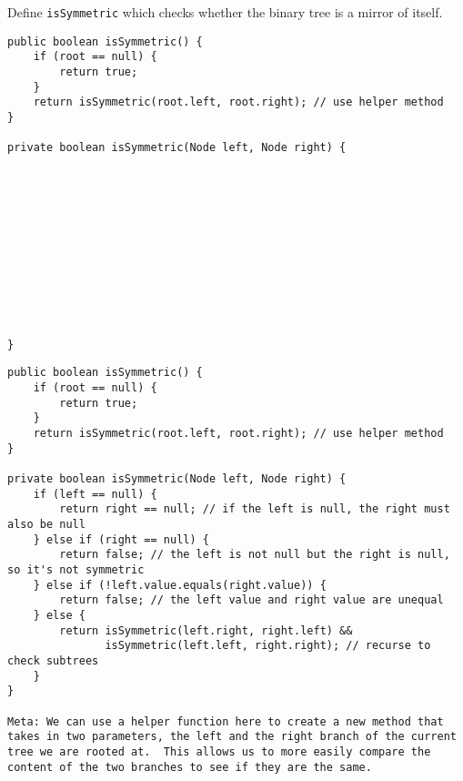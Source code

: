 \question Define \texttt{isSymmetric} which checks whether the binary tree is a mirror of itself.

\ifprintanswers\else
\begin{lstlisting}
public boolean isSymmetric() {
    if (root == null) {
        return true;
    }
    return isSymmetric(root.left, root.right); // use helper method
}

private boolean isSymmetric(Node left, Node right) {












}

\end{lstlisting}
\fi

\begin{solution}
\begin{lstlisting}
public boolean isSymmetric() {
    if (root == null) {
        return true;
    }
    return isSymmetric(root.left, root.right); // use helper method
}

private boolean isSymmetric(Node left, Node right) {
    if (left == null) {
        return right == null; // if the left is null, the right must also be null
    } else if (right == null) {
        return false; // the left is not null but the right is null, so it's not symmetric
    } else if (!left.value.equals(right.value)) {
        return false; // the left value and right value are unequal
    } else {
        return isSymmetric(left.right, right.left) && 
               isSymmetric(left.left, right.right); // recurse to check subtrees
    }
}

Meta: We can use a helper function here to create a new method that takes in two parameters, the left and the right branch of the current tree we are rooted at.  This allows us to more easily compare the content of the two branches to see if they are the same.
\end{lstlisting}
\end{solution}